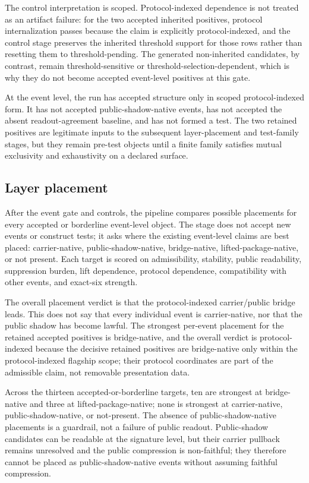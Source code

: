 \documentclass[11pt]{article}
\theoremstyle{definition}
\begin{document}
The control interpretation is scoped. Protocol-indexed dependence is not treated as an artifact failure: for the two accepted inherited positives, protocol internalization passes because the claim is explicitly protocol-indexed, and the control stage preserves the inherited threshold support for those rows rather than resetting them to threshold-pending. The generated non-inherited candidates, by contrast, remain threshold-sensitive or threshold-selection-dependent, which is why they do not become accepted event-level positives at this gate.

At the event level, the run has accepted structure only in scoped protocol-indexed form. It has not accepted public-shadow-native events, has not accepted the absent readout-agreement baseline, and has not formed a test. The two retained positives are legitimate inputs to the subsequent layer-placement and test-family stages, but they remain pre-test objects until a finite family satisfies mutual exclusivity and exhaustivity on a declared surface.

\subsection{Layer placement}
\label{sec:layer-placement}

After the event gate and controls, the pipeline compares possible placements for every accepted or borderline event-level object. The stage does not accept new events or construct tests; it asks where the existing event-level claims are best placed: carrier-native, public-shadow-native, bridge-native, lifted-package-native, or not present. Each target is scored on admissibility, stability, public readability, suppression burden, lift dependence, protocol dependence, compatibility with other events, and exact-six strength.

The overall placement verdict is that the protocol-indexed carrier/public bridge leads. This does not say that every individual event is carrier-native, nor that the public shadow has become lawful. The strongest per-event placement for the retained accepted positives is bridge-native, and the overall verdict is protocol-indexed because the decisive retained positives are bridge-native only within the protocol-indexed flagship scope; their protocol coordinates are part of the admissible claim, not removable presentation data.

Across the thirteen accepted-or-borderline targets, ten are strongest at bridge-native and three at lifted-package-native; none is strongest at carrier-native, public-shadow-native, or not-present. The absence of public-shadow-native placements is a guardrail, not a failure of public readout. Public-shadow candidates can be readable at the signature level, but their carrier pullback remains unresolved and the public compression is non-faithful; they therefore cannot be placed as public-shadow-native events without assuming faithful compression.
\end{document}
